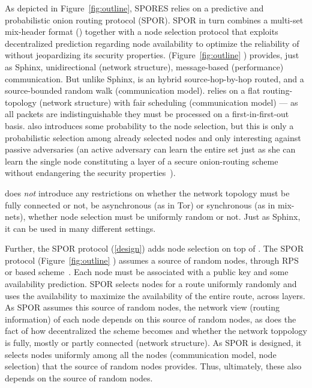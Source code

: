 As depicted in Figure~\ref{fig:outline}, \ac{SPORES} relies on a predictive and probabilistic onion routing protocol (\ac{SPOR}). \ac{SPOR} in turn combines a multi-set mix-header format (\Sphinxes) together with a node selection protocol that exploits decentralized prediction regarding node availability to optimize the reliability of \Sphinxes without jeopardizing its security properties.
\Sphinxes (Figure~\ref{fig:outline} ) provides, just as Sphinx, unidirectional (network structure), 
message-based (performance) communication.
But unlike Sphinx, \Sphinxes is an hybrid source-hop-by-hop routed, and a
source-bounded random walk (communication 
model). \Sphinxes relies on a flat routing-topology (network structure) with fair 
scheduling (communication model) --- as all packets are indistinguishable they 
must be processed on a first-in-first-out basis.
\Sphinxes also introduces some probability to the node selection, but this is 
only a probabilistic selection among already selected nodes and only 
interesting against passive adversaries (an active adversary can learn the 
entire set just as she can learn the single node constituting a layer of a
secure onion-routing scheme without endangering the security
properties~\cite{CLOnionRouting}).

\Sphinxes does \emph{not} introduce any restrictions on whether the network 
topology must be fully connected or not, be asynchronous (as in \ac{Tor}) or 
synchronous (as in mix-nets), whether node selection must be uniformly random 
or not.
Just as Sphinx, it can be used in many different settings.

Further, the \ac{SPOR} protocol (\cref{design}) adds node selection on top of \Sphinxes.
The \ac{SPOR} protocol (Figure~\ref{fig:outline} )  assumes a source of random nodes, \eg through 
\ac{RPS}~\cite[\eg][]{BrahmsRPS} or  based 
scheme~\cite[\eg][]{Octopus}.
Each node must be associated with a public key and some availability 
prediction.
\Ac{SPOR} selects nodes for a route uniformly randomly and uses the 
availability to maximize the availability of the entire route, \ie across 
layers.
 As \ac{SPOR} assumes this source of random nodes, the network view (routing 
information) of each node depends on this source of random nodes, as does the 
fact of how decentralized the scheme becomes and whether the network toppology 
is fully, mostly or partly connected (network structure).
As \ac{SPOR} is designed, it selects nodes uniformly among all the nodes 
(communication model, node selection) that the source of random nodes provides.
Thus, ultimately, these also depends on the source of random nodes.

